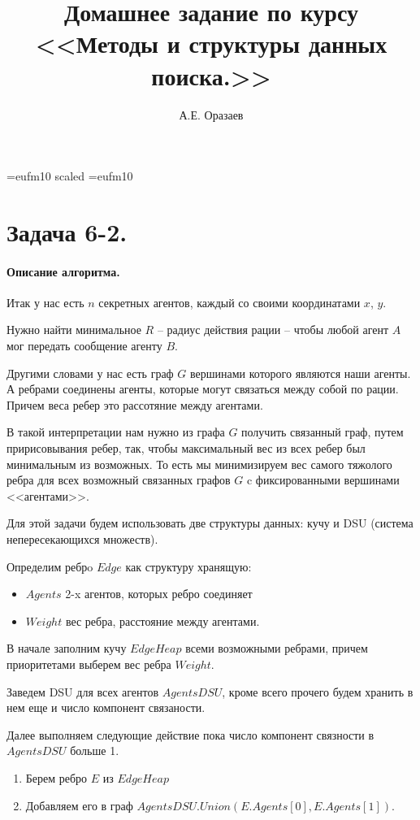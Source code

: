 \documentclass[12pt]{article}
\title{\bf Домашнее задание по курсу \\ <<Методы
и структуры данных поиска.>>}
\author{А.Е. Оразаев}
\date{}
\begin{document}
\voffset=-20mm
\hoffset=-12mm
\font\Got=eufm10 scaled \font\Got=eufm10

\maketitle

\section{Задача 6-2.}
\paragraph{Описание алгоритма.}
Итак у нас есть $ n $ секретных агентов, каждый со своими координатами
$ x $, $ y $.

Нужно найти минимальное $ R $ -- радиус действия рации -- чтобы любой
агент $ A $ мог передать сообщение агенту $ B $.

Другими словами у нас есть граф $ G $ вершинами которого являются наши
агенты. А ребрами соединены агенты, которые могут связаться между собой
по рации. Причем веса ребер это рассотяние между агентами.

В такой интерпретации нам нужно из графа $ G $ получить связанный граф,
путем пририсовывания ребер, так, чтобы максимальный вес из всех ребер
был минимальным из возможных. То есть мы минимизируем вес самого тяжолого
ребра для всех возможный связанных графов $ G $ c фиксированными вершинами
<<агентами>>.


Для этой задачи будем использовать две структуры данных: кучу и DSU (система
непересекающихся множеств).

Определим ребрo $ Edge $ как структуру хранящую:
\begin{itemize}
    \item $ Agents $ 2-x агентов, которых ребро соединяет
    \item $ Weight $ вес ребра, расстояние между агентами.
\end{itemize}


В начале заполним кучу $ EdgeHeap $ всеми возможными ребрами,
причем приоритетами выберем вес ребра $ Weight $.

Заведем DSU для всех агентов $ AgentsDSU $, кроме всего прочего
будем хранить в нем еще и число компонент связаности.

Далее выполняем следующие действие пока число компонент связности
в $ AgentsDSU $ больше 1.
\begin{enumerate}
    \item Берем ребро $ E $ из $ EdgeHeap $
    \item Добавляем его в граф $ AgentsDSU.Union(E.Agents[0], E.Agents[1]) $.
\end{enumerate}
\end{document}
